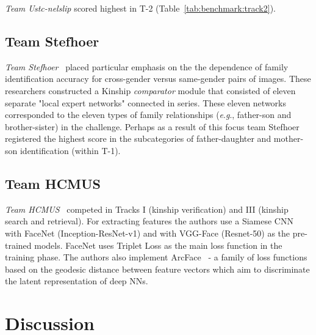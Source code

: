 \documentclass[letterpaper, 10 pt, conference]{ieeeconf}
\newcommand{\eg}{\textit{e}.\textit{g}., }
\begin{document}
\emph{Team Ustc-nelslip} scored highest in T-2 (Table~\ref{tab:benchmark:track2}). 

\subsection{Team Stefhoer}
\emph{Team Stefhoer}~\cite{id2} placed particular emphasis on the the dependence of family identification accuracy for cross-gender versus same-gender pairs of images. These researchers constructed a Kinship \emph{comparator} module that consisted of eleven separate "local expert networks" connected in series. These eleven networks corresponded to the eleven types of family relationships (\eg father-son and brother-sister) in the challenge. Perhaps as a result of this focus team Stefhoer registered the highest score in the subcategories of father-daughter and mother-son identification (within T-1).

\subsection{Team HCMUS}
\emph{Team HCMUS}~\cite{id9} competed in Tracks I (kinship verification) and III (kinship search and retrieval). For extracting features the authors use a Siamese CNN with FaceNet (Inception-ResNet-v1) and with VGG-Face (Resnet-50) as the pre-trained models. FaceNet uses Triplet Loss as the main loss function in the training phase. The authors also implement ArcFace~\cite{deng2019arcface} - a family of loss functions based on the geodesic distance between feature vectors which aim to discriminate the latent representation of deep NNs. 




\acresetall
\section{Discussion}\label{sec:discussion}
\end{document}
